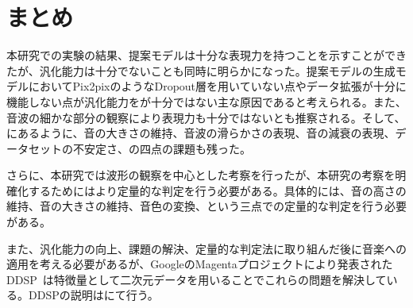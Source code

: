 \chapter{まとめ}

本研究での実験の結果、提案モデルは十分な表現力を持つことを示すことができたが、汎化能力は十分でないことも同時に明らかになった。提案モデルの生成モデルにおいてPix2pixのようなDropout層を用いていない点やデータ拡張が十分に機能しない点が汎化能力をが十分ではない主な原因であると考えられる。また、音波の細かな部分の観察により表現力も十分ではないとも推察される。そして、にあるように、音の大きさの維持、音波の滑らかさの表現、音の減衰の表現、データセットの不安定さ、の四点の課題も残った。

さらに、本研究では波形の観察を中心とした考察を行ったが、本研究の考察を明確化するためにはより定量的な判定を行う必要がある。具体的には、音の高さの維持、音の大きさの維持、音色の変換、という三点での定量的な判定を行う必要がある。

また、汎化能力の向上、課題の解決、定量的な判定法に取り組んだ後に音楽への適用を考える必要があるが、GoogleのMagentaプロジェクトにより発表されたDDSP~\cite{DDSP}は特徴量として二次元データを用いることでこれらの問題を解決している。DDSPの説明はにて行う。